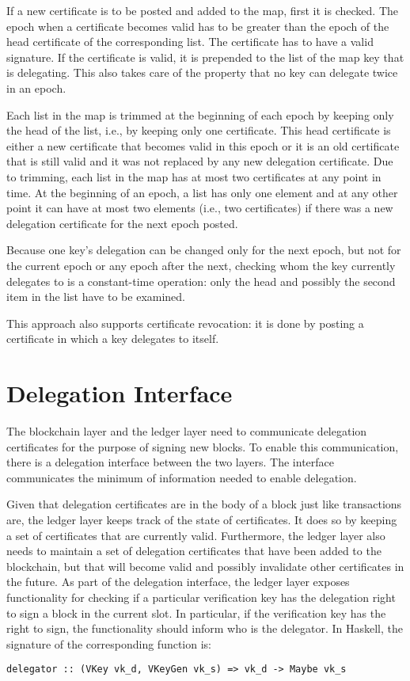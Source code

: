 \documentclass[11pt,a4paper]{article}
\begin{document}
If a new certificate is to be posted and added to the map, first it is
checked.
%
The epoch when a certificate becomes valid has to be greater than the epoch of
the head certificate of the corresponding list.
%
The certificate has to have a valid signature.
%
If the certificate is valid, it is prepended to the list of the map key that
is delegating.
%
This also takes care of the property that no key can delegate
twice in an epoch.


Each list in the map is trimmed at the beginning of each epoch by keeping only
the head of the list, i.e., by keeping only one certificate.
%
This head certificate is either a new certificate that becomes valid in this
epoch or it is an old certificate that is still valid and it was not replaced
by any new delegation certificate.
%
Due to trimming, each list in the map has at most two certificates at any
point in time.
%
At the beginning of an epoch, a list has only one element and at any other
point it can have at most two elements (i.e., two certificates) if there was a
new delegation certificate for the next epoch posted.


Because one key's delegation can be changed only for the next epoch, but
not for the current epoch or any epoch after the next, checking whom the key
currently delegates to is a constant-time operation: only the head and
possibly the second item in the list have to be examined.

This approach also supports certificate revocation: it is done by posting a
certificate in which a key delegates to itself.


\section{Delegation Interface}
\label{sec:del-interface}

The blockchain layer and the ledger layer need to communicate delegation
certificates for the purpose of signing new blocks.
%
To enable this communication, there is a delegation interface between the two
layers.
%
The interface communicates the minimum of information needed to enable
delegation.


Given that delegation certificates are in the body of a block just like
transactions are, the ledger layer keeps track of the state of certificates.
%
It does so by keeping a set of certificates that are currently valid.
%
Furthermore, the ledger layer also needs to maintain a set of delegation
certificates that have been added to the blockchain, but that will become
valid and possibly invalidate other certificates in the future.
%
As part of the delegation interface, the ledger layer exposes functionality
for checking if a particular verification key has the delegation right to sign
a block in the current slot.
%
In particular, if the verification key has the right to sign, the
functionality should inform who is the delegator.
%
In Haskell, the signature of the corresponding function is:
%
\begin{lstlisting}
delegator :: (VKey vk_d, VKeyGen vk_s) => vk_d -> Maybe vk_s
\end{lstlisting}
\end{document}
